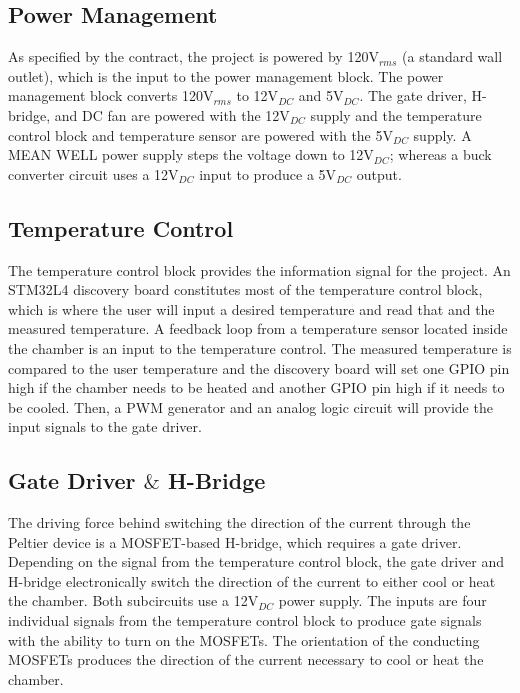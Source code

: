 \documentclass[11pt,letter]{article}
\begin{document}
\subsection{Power Management} %

As specified by the contract, the project is powered by 120V$_{rms}$ (a standard wall outlet), which is the input to the power management block. The power management block converts 120V$_{rms}$ to 12V$_{DC}$ and 5V$_{DC}$. The gate driver, H-bridge, and DC fan are powered with the 12V$_{DC}$ supply and the temperature control block and temperature sensor are powered with the 5V$_{DC}$ supply. A MEAN WELL power supply steps the voltage down to 12V$_{DC}$; whereas a buck converter circuit uses a 12V$_{DC}$ input to produce a 5V$_{DC}$ output.

\subsection{Temperature Control} %

The temperature control block provides the information signal for the project. An STM32L4 discovery board constitutes most of the temperature control block, which is where the user will input a desired temperature and read that and the measured temperature. A feedback loop from a temperature sensor located inside the chamber is an input to the temperature control. The measured temperature is compared to the user temperature and the discovery board will set one GPIO pin high if the chamber needs to be heated and another GPIO pin high if it needs to be cooled. Then, a PWM generator and an analog logic circuit will provide the input signals to the gate driver.

\subsection{Gate Driver $\&$ H-Bridge} %

The driving force behind switching the direction of the current through the Peltier device is a MOSFET-based H-bridge, which requires a gate driver. Depending on the signal from the temperature control block, the gate driver and H-bridge electronically switch the direction of the current to either cool or heat the chamber. Both subcircuits use a 12V$_{DC}$ power supply. The inputs are four individual signals from the temperature control block to produce gate signals with the ability to turn on the MOSFETs. The orientation of the conducting MOSFETs produces the direction of the current necessary to cool or heat the chamber.
\end{document}
